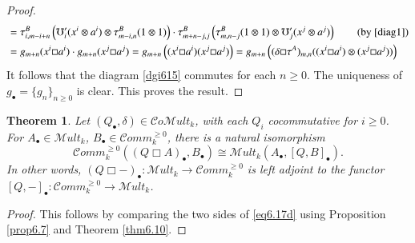 \documentclass[10pt, colorlinks]{article}
\numberwithin{equation}{section} \DeclareMathSizes{2}{10}{12}{13}
\newtheorem{Thm}[thm]{Theorem}
\begin{document}
\begin{proof}
\begin{align*}
            &=\tau^B_{i,m-i+n}\left(\mho'_i(x^i\otimes a^i)\otimes \tau^B_{m-i,n}(1\otimes 1)\right)\cdot\tau^B_{m+n-j,j}\left(\tau^B_{m,n-j}(1\otimes 1)\otimes \mho'_j(x^j\otimes a^j)\right)\tag{by \eqref{diag1}}\\
            &=g_{m+n}(x^i\Box a^i)\cdot g_{m+n}(x^j\Box a^j)
            =g_{m+n}\left((x^i\Box a^i)(x^j\Box a^j)\right) =g_{m+n}\left((\delta\Box \tau^A)_{m,n}((x^i\Box a^i)\otimes (x^j\Box a^j))\right)
        \end{align*}
        It follows that the diagram \eqref{dgi615} commutes for each $n\geq 0$. The uniqueness of $g_\bullet=\{g_n\}_{n\geq 0}$  is clear. This proves the result.
        \end{proof}


        
        \begin{Thm}
          Let   $(Q_\bullet,\delta)\in \mathcal Co\mathscr Mult_k$, with each $Q_i$ cocommutative for $i\geq 0$.     For  $A_\bullet\in \mathscr Mult_k$,  $B_\bullet\in \mathcal Comm_k^{\geq 0}$, there is a natural isomorphism
            \begin{equation}\label{eq6.17d}
                  \mathcal Comm_k^{\geq 0}((Q\Box  A)_\bullet, B_\bullet)\cong  \mathscr Mult_k(A_\bullet,  [Q,B]_\bullet). 
            \end{equation}
             In other words, $(Q\Box-)_\bullet:\mathscr Mult_k\longrightarrow \mathcal Comm^{\geq 0}_k$ is left adjoint to the functor  $[Q,-]_\bullet:\mathcal Comm^{\geq 0}_k\longrightarrow \mathscr Mult_k$.
        \end{Thm}
        \begin{proof} This follows by comparing the two sides of \eqref{eq6.17d} using 
            Proposition \ref{prop6.7} and Theorem \ref{thm6.10}.

            

        \end{proof}
\end{document}
